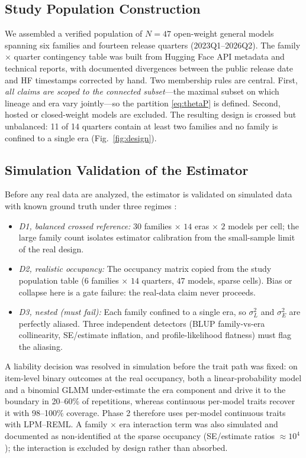 \documentclass{ieeeaccess}
\theoremstyle{definition}
\theoremstyle{plain}
\begin{document}
\subsection{Study Population Construction}
\label{sec:phase0}
We assembled a verified population of $N=47$ open-weight general models spanning six
families and fourteen release quarters (2023Q1--2026Q2). The family $\times$ quarter
contingency table was built from Hugging Face API metadata and technical reports,
with documented divergences between the public release date and HF timestamps
corrected by hand. Two membership rules are central. First, \emph{all claims are
scoped to the connected subset}---the maximal subset on which lineage and era vary
jointly---so the partition \eqref{eq:thetaP} is defined. Second, hosted or
closed-weight models are excluded. The resulting design is crossed but unbalanced:
11 of 14 quarters contain at least two families and no family is confined to a
single era (Fig.~\ref{fig:design}).

\subsection{Simulation Validation of the Estimator}
\label{sec:phase1}
Before any real data are analyzed, the estimator is validated on simulated data
with known ground truth under three regimes \cite{harville1977}:
\begin{itemize}
\item \emph{D1, balanced crossed reference:} $30$ families $\times$ $14$ eras
  $\times$ $2$ models per cell; the large family count isolates estimator
  calibration from the small-sample limit of the real design.
\item \emph{D2, realistic occupancy:} The occupancy matrix copied from the study
  population table ($6$ families $\times$ $14$ quarters, $47$ models, sparse
  cells). Bias or collapse here is a gate failure: the real-data claim never
  proceeds.
\item \emph{D3, nested (must fail):} Each family confined to a single era, so
  $\sigma^{2}_{L}$ and $\sigma^{2}_{E}$ are perfectly aliased. Three independent
  detectors (BLUP family-vs-era collinearity, SE/estimate inflation, and
  profile-likelihood flatness) must flag the aliasing.
\end{itemize}
A liability decision was resolved in simulation before the trait path was fixed:
on item-level binary outcomes at the real occupancy, both a linear-probability
model and a binomial GLMM under-estimate the era component and drive it to the
boundary in 20--60\% of repetitions, whereas continuous per-model traits recover it
with 98--100\% coverage. Phase 2 therefore uses per-model continuous traits with
LPM--REML. A family $\times$ era interaction term was also simulated and documented
as non-identified at the sparse occupancy (SE/estimate ratios $\approx10^{4}$); the
interaction is excluded by design rather than absorbed.
\end{document}
